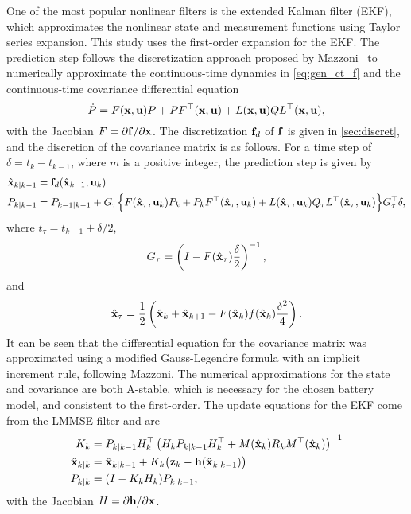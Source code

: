 \documentclass[../zhang_thesis.tex]{subfiles}
\begin{document}
One of the most popular nonlinear filters is the extended Kalman filter (EKF), which approximates the nonlinear state and measurement functions using Taylor series expansion. This study uses the first-order expansion for the EKF. The prediction step follows the discretization approach proposed by Mazzoni~\cite{mazzoni07} to numerically approximate the continuous-time dynamics in \cref{eq:gen_ct_f} and the continuous-time covariance differential equation
\begin{equation}
    \dot{P} = F(\mathbf{x},\mathbf{u}) P + P F^\top(\mathbf{x},\mathbf{u}) + L(\mathbf{x},\mathbf{u}) Q L^\top(\mathbf{x},\mathbf{u}),
\end{equation}
with the Jacobian $F=\partial\mathbf{f}/\partial\mathbf{x}$. The discretization $\mathbf{f}_d$ of $\mathbf{f}$ is given in \cref{sec:discret}, and the discretion of the covariance matrix is as follows. For a time step of $\delta=t_k-t_{k-1}$, where $m$ is a positive integer, the prediction step is given by
\begin{align}
    \hat{\mathbf{x}}_{k|k-1} &= \mathbf{f}_d(\hat{\mathbf{x}}_{k-1},\mathbf{u}_k) \label{eq:ekfpredx} \\
    P_{k|k-1} &= P_{k-1|k-1} + G_\tau \Big\{ F(\hat{\mathbf{x}}_\tau,\mathbf{u}_k) P_k + P_k F^\top(\hat{\mathbf{x}}_\tau,\mathbf{u}_k) + L(\hat{\mathbf{x}}_\tau,\mathbf{u}_k) Q_\tau L^\top(\hat{\mathbf{x}}_\tau,\mathbf{u}_k) \Big\} G_\tau^\top \delta, \label{eq:ekfpredz}
\end{align}
where $t_\tau = t_{k-1}+\delta/2$, 
\begin{equation}
    G_\tau = \left( I - F(\hat{\mathbf{x}}_\tau) \frac{\delta}{2} \right)^{-1},
\end{equation}
and
\begin{equation}
    \hat{\mathbf{x}}_\tau = \frac{1}{2} \left( \hat{\mathbf{x}}_k + \hat{\mathbf{x}}_{k+1} - F(\hat{\mathbf{x}}_k) f(\hat{\mathbf{x}}_k) \frac{\delta^2}{4} \right).
\end{equation}
It can be seen that the differential equation for the covariance matrix was approximated using a modified Gauss-Legendre formula with an implicit increment rule, following Mazzoni. The numerical approximations for the state and covariance are both A-stable, which is necessary for the chosen battery model, and consistent to the first-order. 
The update equations for the EKF come from the LMMSE filter and are
\begin{align}
    K_k &= P_{k|k-1} H_k^\top \left( H_k P_{k|k-1} H_k^\top + M(\hat{\mathbf{x}}_k) R_k M^\top(\hat{\mathbf{x}}_k) \right)^{-1} \\
    \hat{\mathbf{x}}_{k|k} &= \hat{\mathbf{x}}_{k|k-1} + K_k \big( \mathbf{z}_k - \mathbf{h}(\hat{\mathbf{x}}_{k|k-1}) \big) \\
    P_{k|k} &= (I - K_k H_k) P_{k|k-1},
\end{align}
with the Jacobian $H=\partial\mathbf{h}/\partial\mathbf{x}$.
\end{document}
